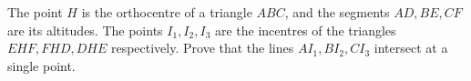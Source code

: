 The point $H$ is the orthocentre of a triangle $ABC$,  and the segments $AD,BE,CF$ are its altitudes. The points $I_1,I_2,I_3$ are the incentres of the triangles $EHF,FHD,DHE$ respectively. Prove that the lines $AI_1,BI_2,CI_3$ intersect at a single point.